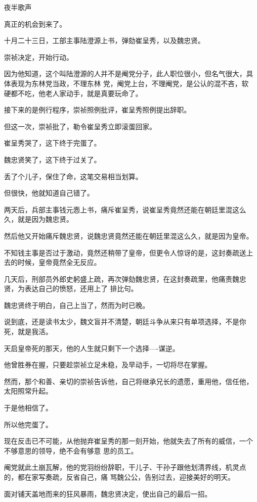 \documentclass[11pt,a4paper,onecolumn]{article}
\begin{document}
夜半歌声

真正的机会到来了。

十月二十三日，工部主事陆澄源上书，弹劾崔呈秀，以及魏忠贤。

崇祯决定，开始行动。

因为他知道，这个叫陆澄源的人并不是阉党分子，此人职位很小，但名气很大，具体表现为东林党当政，不理东林
党，阉党上台，不理阉党，是公认的混不吝，软硬都不吃，他老人家动手，就是真要玩命了。

接下来的是例行程序，崇祯照例批评，崔呈秀照例提出辞职。

但这一次，崇祯批了，勒令崔呈秀立即滚蛋回家。

崔呈秀哭了，这下终于完蛋了。

魏忠贤笑了，这下终于过关了。

丢了个儿子，保住了命，这笔交易相当划算。

但很快，他就知道自己错了。

两天后，兵部主事钱元悫上书，痛斥崔呈秀，说崔呈秀竟然还能在朝廷里混这么久，就是因为魏忠贤。

然后他又开始痛斥魏忠贤，说魏忠贤竟然还能在朝廷里混这么久，就是因为皇帝。

不知钱主事是否过于激动，竟然还稍带了皇帝，但更令人惊讶的是，这封奏疏送上去的时候，皇帝竟然全无反应。

几天后，刑部员外郎史躬盛上疏，再次弹劾魏忠贤，在这封奏疏里，他痛责魏忠贤，为表达自己的愤怒，还用上了
排比句。

魏忠贤终于明白，自己上当了，然而为时已晚。

说到底，还是读书太少，魏文盲并不清楚，朝廷斗争从来只有单项选择，不是你死，就是我活。

天启皇帝死的那天，他的人生就只剩下一个选择----谋逆。

他曾胜券在握，只要趁崇祯立足未稳，及早动手，一切将尽在掌握。

然而，那个和善、亲切的崇祯告诉他，自己将继承兄长的遗愿，重用他，信任他，太阳照常升起。

于是他相信了。

所以他完蛋了。

现在反击已不可能，从他抛弃崔呈秀的那一刻开始，他就失去了所有的威信，一个不够意思的领导，绝不会有够意
思的员工。

阉党就此土崩瓦解，他的党羽纷纷辞职，干儿子、干孙子跟他划清界线，机灵点的，都在家写奏疏，反省自己，痛
骂魏公公，告别过去，迎接美好的明天。

面对铺天盖地而来的狂风暴雨，魏忠贤决定，使出自己的最后一招。

\section[\thesection]{}
\end{document}
